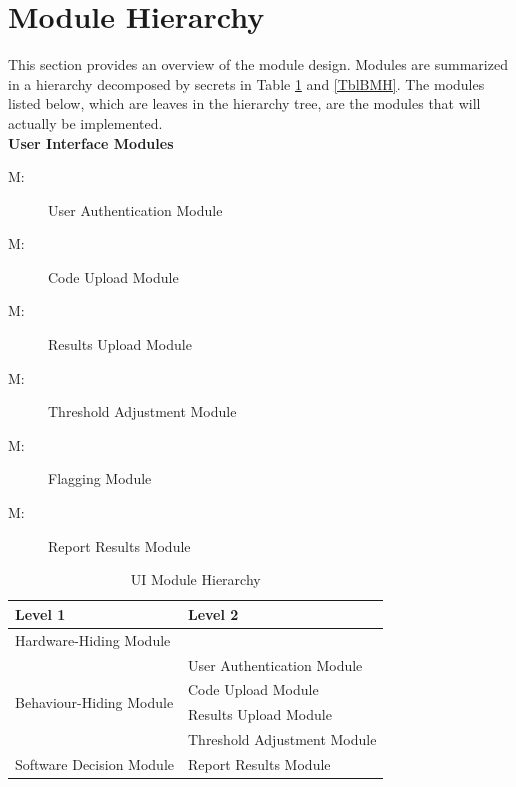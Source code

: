 \documentclass[12pt, titlepage]{article}
\newcounter{mnum}
\newcommand{\mthemnum}{M\themnum}
\begin{document}
\section{Module Hierarchy} \label{SecMH}

This section provides an overview of the module design. Modules are summarized
in a hierarchy decomposed by secrets in Table \ref{TblUIMH} and \ref{TblBMH}. The modules listed
below, which are leaves in the hierarchy tree, are the modules that will
actually be implemented. \\

\textbf{User Interface Modules}
\begin{description}
  \item [ \mthemnum \label{mAuth}:] User Authentication Module
  \item [ \mthemnum \label{mCodeUpload}:] Code Upload Module
  \item [ \mthemnum \label{mResultsUpload}:] Results Upload Module
  \item [ \mthemnum \label{mThreshold}:] Threshold Adjustment Module
  \item [ \mthemnum \label{mFlagging}:] Flagging Module
  \item [ \mthemnum \label{mResults}:] Report Results Module
\end{description}

\begin{table}[h!]
  \centering
  \begin{tabular}{p{} p{}}
  \toprule
  \textbf{Level 1} & \textbf{Level 2} \\
  \midrule
  {Hardware-Hiding Module} & ~ \\
  \midrule
  \multirow{4}{*}{Behaviour-Hiding Module} & User Authentication Module \\
  & Code Upload Module \\
  & Results Upload Module \\
  & Threshold Adjustment Module \\
  \midrule
  \multirow{1}{*}{Software Decision Module} & Report Results Module \\
  \bottomrule
  \end{tabular}
  \caption{UI Module Hierarchy}
  \label{TblUIMH}
\end{table}
\end{document}
